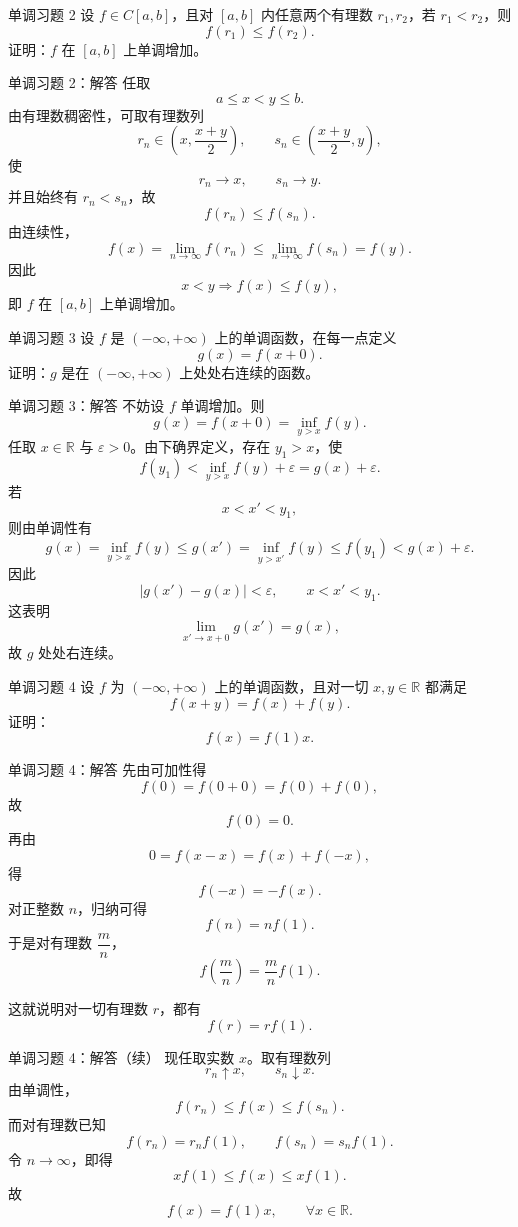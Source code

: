 ﻿\documentclass[aspectratio=169,11pt]{ctexbeamer}
\newcommand{\R}{\mathbb{R}}
\begin{document}
\begin{frame}{单调习题 2}
设 $f\in C[a,b]$，且对 $[a,b]$ 内任意两个有理数 $r_1,r_2$，若 $r_1<r_2$，则
\[
  f(r_1)\le f(r_2).
\]
证明：$f$ 在 $[a,b]$ 上单调增加。
\end{frame}

\begin{frame}[allowframebreaks]{单调习题 2：解答}
任取
\[
  a\le x<y\le b.
\]
由有理数稠密性，可取有理数列
\[
  r_n\in\left(x,\frac{x+y}{2}\right),\qquad s_n\in\left(\frac{x+y}{2},y\right),
\]
使
\[
  r_n\to x,\qquad s_n\to y.
\]
并且始终有 $r_n<s_n$，故
\[
  f(r_n)\le f(s_n).
\]
由连续性，
\[
  f(x)=\lim_{n\to\infty}f(r_n)\le \lim_{n\to\infty}f(s_n)=f(y).
\]
因此
\[
  x<y \Longrightarrow f(x)\le f(y),
\]
即 $f$ 在 $[a,b]$ 上单调增加。
\end{frame}

\begin{frame}{单调习题 3}
设 $f$ 是 $(-\infty,+\infty)$ 上的单调函数，在每一点定义
\[
  g(x)=f(x+0).
\]
证明：$g$ 是在 $(-\infty,+\infty)$ 上处处右连续的函数。
\end{frame}

\begin{frame}[allowframebreaks]{单调习题 3：解答}
不妨设 $f$ 单调增加。则
\[
  g(x)=f(x+0)=\inf_{y>x} f(y).
\]
任取 $x\in\R$ 与 $\varepsilon>0$。由下确界定义，存在 $y_1>x$，使
\[
  f(y_1)<\inf_{y>x}f(y)+\varepsilon=g(x)+\varepsilon.
\]
若
\[
  x<x'<y_1,
\]
则由单调性有
\[
  g(x)=\inf_{y>x}f(y)\le g(x')=\inf_{y>x'}f(y)\le f(y_1)<g(x)+\varepsilon.
\]
因此
\[
  |g(x')-g(x)|<\varepsilon,\qquad x<x'<y_1.
\]
这表明
\[
  \lim_{x'\to x+0}g(x')=g(x),
\]
故 $g$ 处处右连续。
\end{frame}

\begin{frame}{单调习题 4}
设 $f$ 为 $(-\infty,+\infty)$ 上的单调函数，且对一切 $x,y\in\R$ 都满足
\[
  f(x+y)=f(x)+f(y).
\]
证明：
\[
  f(x)=f(1)x.
\]
\end{frame}

\begin{frame}[allowframebreaks]{单调习题 4：解答}
先由可加性得
\[
  f(0)=f(0+0)=f(0)+f(0),
\]
故
\[
  f(0)=0.
\]
再由
\[
  0=f(x-x)=f(x)+f(-x),
\]
得
\[
  f(-x)=-f(x).
\]
对正整数 $n$，归纳可得
\[
  f(n)=nf(1).
\]
于是对有理数 $\dfrac{m}{n}$，
\[
  f\!\left(\frac{m}{n}\right)=\frac{m}{n}f(1).
\]
\medskip

这就说明对一切有理数 $r$，都有
\[
  f(r)=rf(1).
\]
\end{frame}

\begin{frame}{单调习题 4：解答（续）}
现任取实数 $x$。取有理数列
\[
  r_n\uparrow x,\qquad s_n\downarrow x.
\]
由单调性，
\[
  f(r_n)\le f(x)\le f(s_n).
\]
而对有理数已知
\[
  f(r_n)=r_n f(1),\qquad f(s_n)=s_n f(1).
\]
令 $n\to\infty$，即得
\[
  xf(1)\le f(x)\le xf(1).
\]
故
\[
  f(x)=f(1)x,\qquad \forall x\in\R.
\]
\end{frame}
\end{document}
